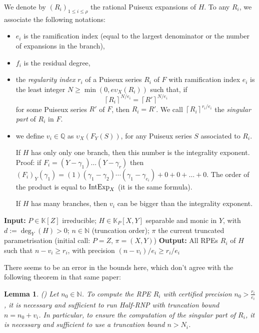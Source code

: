 \documentclass[a4paper,11pt,reqno]{amsart}%
\theoremstyle{definition}
\theoremstyle{plain}
\newtheorem{lemma}[definition]{Lemma}
\theoremstyle{remark}
\newcommand\ct[1]{\text{\rmfamily\upshape #1}}
\newcommand{\IntExpX}{\ct{IntExp}_X}
\begin{document}
We denote by \( (R_i)_{1 \le i \le \rho} \) the rational Puiseux expansions of \( H \). To any \( R_i \), we associate the following notations:
\begin{itemize}
    \item $e_i$ is the ramification index (equal to the largest denominator or the number of expansions in the branch),
    \item $f_i$ is the residual degree,
    \item the \emph{regularity index} \( r_i \) of a Puiseux series \( R_i \) of \( F \) with ramification index \( e_i \) is the least integer \( N \ge \min(0, e \upsilon_X(R_i)) \) such that, if
\[
\left\lceil R_i \right\rceil^{N/e_i} = \left\lceil R' \right\rceil^{N/e_i}
\]
for some Puiseux series \( R' \) of \( F \), then \( R_i = R' \). We call \( \left\lceil R_i \right\rceil^{r_i/e_i} \) the \emph{singular part} of \( R_i \) in \( F \).
    \item we define \( v_i \in \mathbb{Q} \) as \( \upsilon_X(F_Y(S)) \), for any Puiseux series \( S \) associated to \( R_i \).

    If $H$ has only only one branch, then this number is the integrality exponent. Proof: if $F_i = (Y-\gamma_1) \dots (Y-\gamma_r)$ then $(F_i)_Y(\gamma_1) = (1)(\gamma_1 - \gamma_2)\cdots (\gamma_1 - \gamma_{e_i}) + 0 + 0 + \dots + 0$. The order of the product is equal to $\IntExpX$ (it is the same formula).

    If $H$ has many branches, then $v_i$ can be bigger than the integrality exponent.
\end{itemize}

\begin{algorithm}[H]
\caption{Half-RNP($H, P, n, \pi$)}
\label{algo:halfRNP}
\begin{algorithmic}[1]
\State \textbf{Input:} $P \in \mathbb{K}[Z]$ irreducible;
$H \in \mathbb{K}_P[X, Y]$ separable and monic in $Y$, with $d := \deg_Y(H) > 0$;
$n \in \mathbb{N}$ (truncation order); $\pi$ the current truncated parametrisation (initial call: $P = Z$, $\pi = (X, Y)$)
\State \textbf{Output:} All RPEs $R_i$ of $H$ such that $n - v_i \ge r_i$, with precision $(n - v_i)/e_i \ge r_i/e_i$
\end{algorithmic}
\end{algorithm}

There seems to be an error in the bounds here, which don't agree with the following theorem in that same paper:

\begin{lemma}(\cite[Lemma 3.19]{poteaux2021})
\label{lemma:pebound}
Let $n_0 \in \mathbb{N}$. To compute the RPE $R_i$ with certified precision
$n_0 > \frac{r_i}{e_i}$, it is necessary and sufficient to run \emph{Half-RNP}
with truncation bound $n = n_0 + v_i$. In particular, to ensure the computation
of the singular part of $R_i$, it is necessary and sufficient to use a truncation
bound $n > N_i$.
\end{lemma}
\end{document}
